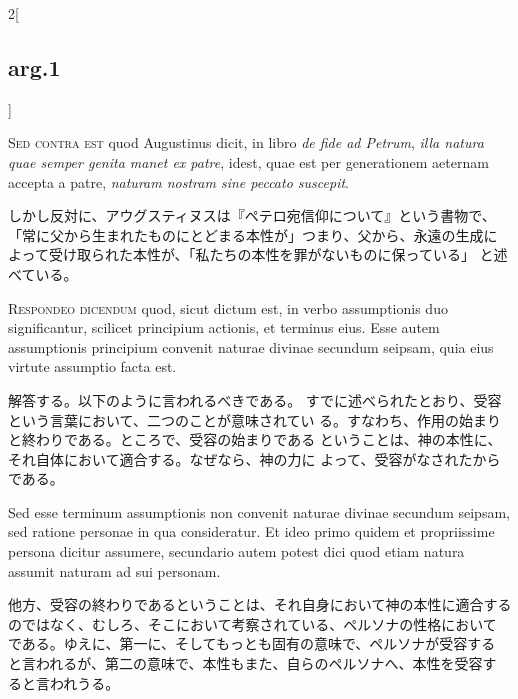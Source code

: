 \documentclass[paper=a4paper,fontsize=10pt,jafontsize=9pt,titlepage]{jlreq}
\begin{document}
\begin{paracol}{2}[\subsection{arg.1}]
\switchcolumn*[\subsection{s.c.}]

{\scshape Sed contra est} quod Augustinus dicit, in libro {\itshape de fide ad Petrum}, {\itshape illa
 natura quae semper genita manet ex patre}, idest, quae est per
 generationem aeternam accepta a patre, {\itshape naturam nostram sine peccato
 suscepit}.

\switchcolumn

しかし反対に、アウグスティヌスは『ペテロ宛信仰について』という書物で、
 「常に父から生まれたものにとどまる本性が」つまり、父から、永遠の生成に
 よって受け取られた本性が、「私たちの本性を罪がないものに保っている」
 と述べている。


{\scshape Respondeo dicendum} quod, sicut dictum est, in verbo assumptionis duo
 significantur, scilicet principium actionis, et terminus eius. Esse
 autem assumptionis principium convenit naturae divinae secundum
 seipsam, quia eius virtute assumptio facta est.

\switchcolumn

解答する。以下のように言われるべきである。
すでに述べられたとおり、受容という言葉において、二つのことが意味されてい
 る。すなわち、作用の始まりと終わりである。ところで、受容の始まりである
 ということは、神の本性に、それ自体において適合する。なぜなら、神の力に
 よって、受容がなされたからである。

\switchcolumn*

Sed esse terminum
 assumptionis non convenit naturae divinae secundum seipsam, sed ratione
 personae in qua consideratur. Et ideo primo quidem et propriissime
 persona dicitur assumere, secundario autem potest dici quod etiam
 natura assumit naturam ad sui personam.

\switchcolumn

他方、受容の終わりであるということは、それ自身において神の本性に適合する
 のではなく、むしろ、そこにおいて考察されている、ペルソナの性格において
 である。ゆえに、第一に、そしてもっとも固有の意味で、ペルソナが受容する
 と言われるが、第二の意味で、本性もまた、自らのペルソナへ、本性を受容す
 ると言われうる。

\switchcolumn*


\end{paracol}
\end{document}
